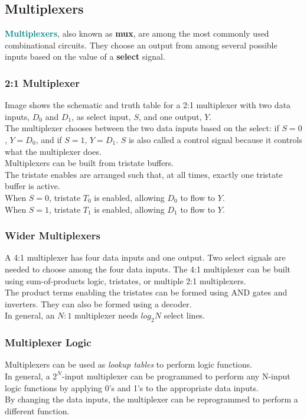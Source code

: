 \documentclass[12pt]{article}
\theoremstyle{definition}
\newcommand{\defnterm}[1]{\textbf{\textcolor{teal}{#1}}\index{#1}}
\begin{document}
  \subsection{Multiplexers}
  \defnterm{Multiplexers}, also known as \textbf{mux}, are among the most commonly used combinational circuits.
  They choose an output from among several possible inputs based on the value of a \textbf{select} signal.

  \subsubsection{2:1 Multiplexer}
  Image shows the schematic and truth table for a 2:1 multiplexer with two data inputs, $D_0$ and $D_1$, as select input, $S$, and one output, $Y$. \\
  The multiplexer chooses between the two data inputs based on the select: if $S = 0$, $Y = D_0$, and if $S = 1$, $Y = D_1$.
  $S$ is also called a control signal because it controls what the multiplexer does. \\

  Multiplexers can be built from tristate buffers. \\
  The tristate enables are arranged such that, at all times, exactly one tristate buffer is active. \\
  When $S = 0$, tristate $T_0$ is enabled, allowing $D_0$ to flow to $Y$. \\
  When $S = 1$, tristate $T_1$ is enabled, allowing $D_1$ to flow to $Y$.

  \subsubsection{Wider Multiplexers}
  A 4:1 multiplexer has four data inputs and one output.
  Two select signals are needed to choose among the four data inputs.
  The 4:1 multiplexer can be built using sum-of-products logic, tristates, or multiple 2:1 multiplexers. \\

  The product terms enabling the tristates can be formed using AND gates and inverters.
  They can also be formed using a decoder. \\

  In general, an $N:1$ multiplexer needs $log_{2} N$ select lines.

  \subsubsection{Multiplexer Logic}
  Multiplexers can be used as \emph{lookup tables} to perform logic functions. \\
  In general, a $2^{N}$-input multiplexer can be programmed to perform any N-input logic functions by applying 0's and 1's to the appropriate data inputs. \\
  By changing the data inputs, the multiplexer can be reprogrammed to perform a different function.
\end{document}
